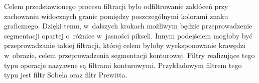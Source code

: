 Celem przedstawionego procesu filtracji było odfiltrowanie zakłóceń przy zachowaniu widocznych granic pomiędzy poszczególnymi kolorami znaku graficznego. Dzięki temu, w~dalszych krokach możliwym będzie przeprowadzenie segmentacji opartej o~różnice w~jasności pikseli. Innym podejściem mogłoby być przeprowadzanie  takiej filtracji, której celem byłoby wyeksponowanie krawędzi w~obrazie, celem przeprowadzenia segmentacji konturowej. Filtry realizujące tego typu operacje nazyawne są filtrami konturowymi. Przykładowym filtrem tego typu jest filtr Sobela oraz filtr Prewitta.

\begin{figure}[H]
    \centering
    \\

\end{figure}
